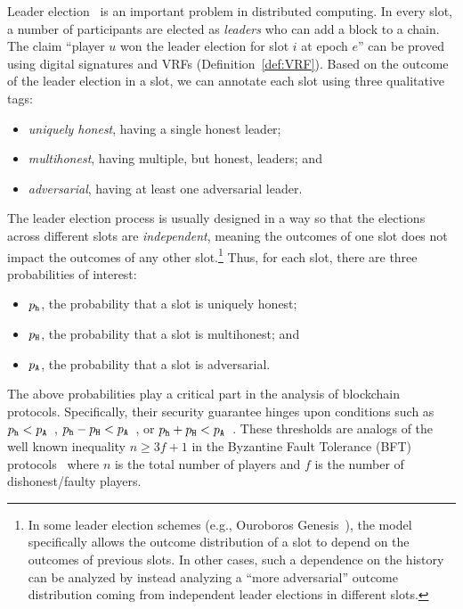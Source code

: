 \label{sec:leader-election-probs}
Leader election~\cite{RSZ} is an important problem in distributed computing.
In every slot, 
a number of participants are elected as \emph{leaders} who can add a block to a chain. 
The claim ``player $u$ won the leader election for slot $i$ at epoch $e$'' 
can be proved using digital signatures and VRFs (Definition~\ref{def:VRF}).
Based on the outcome of the leader election in a slot, 
we can annotate each slot using three qualitative tags: 
\begin{itemize}
\item \emph{uniquely honest}, having a single honest leader;
\item \emph{multihonest}, having multiple, but honest,
  leaders; and
\item \emph{adversarial}, having at least one adversarial leader.
\end{itemize}
The leader election process is usually designed in a way so that 
the elections across different slots are \emph{independent}, 
meaning the outcomes of one slot does not impact the outcomes of any other slot.\footnote{
  In some leader election schemes (e.g., Ouroboros Genesis~\cite{Genesis}), 
  the model specifically allows 
  the outcome distribution of a slot to depend on the outcomes of previous slots. 
  In other cases, 
  such a dependence on the history can be analyzed 
  by instead analyzing a ``more adversarial'' outcome distribution 
  coming from independent leader elections in different slots. 
}
Thus, for each slot, there are three probabilities of interest:
\begin{itemize}
\item $p_{\mathtt{h}}$, the probability that a slot is uniquely honest;
\item $p_{\mathtt{H}}$, the probability that a slot is multihonest; and
\item $p_{\mathtt{A}}$, the probability that a slot is adversarial.
\end{itemize}

The above probabilities play a critical part 
in the analysis of blockchain protocols. 
Specifically, 
their security guarantee hinges upon conditions such as 
$p_{\mathtt{h}} < p_{\mathtt{A}}$~\cite{SnowWhite}, 
$p_{\mathtt{h}} - p_{\mathtt{H}} < p_{\mathtt{A}}$~\cite{Ouroboros,Praos,Genesis}, 
or $p_{\mathtt{h}} + p_{\mathtt{H}} < p_{\mathtt{A}}$~\cite{Nakamoto2008,GKL,PSS}.
These thresholds are analogs of the well known inequality 
$n \geq 3f + 1$ in the Byzantine Fault Tolerance (BFT) protocols~\cite{BFT} 
where $n$ is the total number of players and $f$ is the number of dishonest/faulty players.


